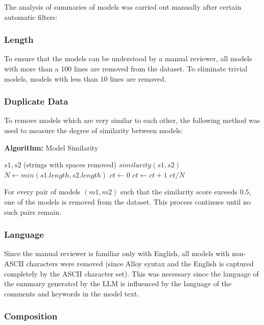 \documentclass[conference]{IEEEtran}
\begin{document}
The analysis of summaries of models was carried out manually after certain automatic filters:

\subsubsection{Length}

To ensure that the models can be understood by a manual reviewer, all models with more than a 100 lines are removed from the dataset. To eliminate trivial models, models with less than 10 lines are removed.

\subsubsection{Duplicate Data}

To remove models which are very similar to each other, the following method was used to measure the degree of similarity between models:

\begin{center}
\textbf{Algorithm:} Model Similarity
\end{center}
\begin{algorithmic}[1]  %
\REQUIRE $s1, s2$ (strings with spaces removed)
\ENSURE $similarity(s1, s2)$
\STATE $N \gets min(s1.length ,s2.length)$
\STATE $ct \gets 0$
        \STATE $ct \gets ct + 1$
    \ENDIF
\ENDFOR
\RETURN $ct/N$
\end{algorithmic}
    
For every pair of models $(m1,m2)$ such that the similarity score exceeds $0.5$, one of the models is removed from the dataset. This process continues until no such pairs remain.

\subsubsection{Language}

Since the manual reviewer is familiar only with English, all models with non-ASCII characters were removed (since Alloy syntax and the English is captured completely by the ASCII character set). This was necessary since the language of the summary generated by the LLM is influenced by the language of the comments and keywords in the model text.

\subsubsection{Composition}
\end{document}
